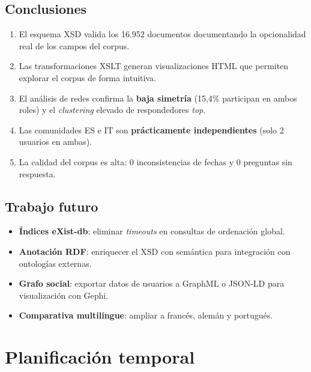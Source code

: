 \documentclass[10pt,twocolumn,a4paper]{article}
\begin{document}
\subsection{Conclusiones}

\begin{enumerate}[leftmargin=1.8em,itemsep=0pt,topsep=2pt]
    \item El esquema XSD valida los 16.952 documentos documentando
          la opcionalidad real de los campos del corpus.
    \item Las transformaciones XSLT generan visualizaciones HTML
          que permiten explorar el corpus de forma intuitiva.
    \item El an\'alisis de redes confirma la \textbf{baja simetr\'ia}
          (15,4\% participan en ambos roles) y el \textit{clustering}
          elevado de respondedores \textit{top}.
    \item Las comunidades ES e IT son \textbf{pr\'acticamente independientes}
          (solo 2 usuarios en ambas).
    \item La calidad del corpus es alta: 0 inconsistencias de fechas
          y 0 preguntas sin respuesta.
\end{enumerate}

\subsection{Trabajo futuro}

\begin{itemize}[leftmargin=1.5em,itemsep=0pt,topsep=2pt]
    \item \textbf{\'Indices eXist-db}: eliminar \textit{timeouts} en
          consultas de ordenaci\'on global.
    \item \textbf{Anotaci\'on RDF}: enriquecer el XSD con sem\'antica
          para integraci\'on con ontolog\'ias externas.
    \item \textbf{Grafo social}: exportar datos de usuarios a GraphML
          o JSON-LD para visualizaci\'on con Gephi.
    \item \textbf{Comparativa multilingue}: ampliar a franc\'es,
          alem\'an y portugu\'es.
\end{itemize}

\section{Planificaci\'on temporal}
\end{document}
